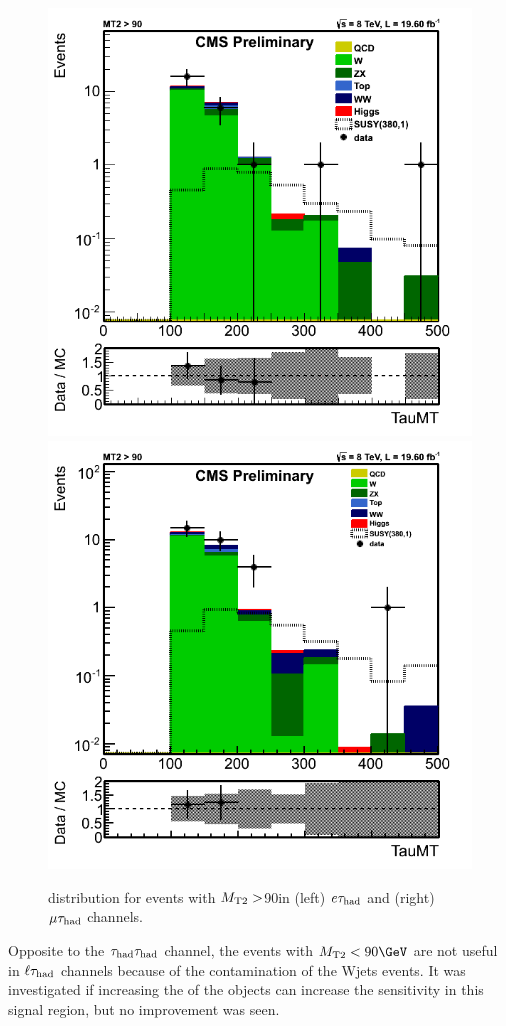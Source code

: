 \begin{figure}[!Hhtb]
\centering
\includegraphics[angle=0,scale=0.35]{SelectionEleTau/TauMT.png}
\includegraphics[angle=0,scale=0.35]{SelectionMuTau/tauMT_Ratio_MT2gt90_unBlinded.png}
\caption{\tauMT distribution for events with ${M_{\rm T2}}>$90\GeV in (left) $e\tau_{\rm had}$ and (right) $\mu\tau_{\rm had}$ channels.}
\label{fig:taumtleptontau}
\end{figure}
Opposite to the $\tau_{\rm had}\tau_{\rm had}$ channel, the events with $\mttwo<90 \GeV$ are not useful in $\ell\tau_{\rm had}$ channels because of the contamination of
the Wjets events. It was investigated if increasing the \PT of the objects can increase the sensitivity in this signal region, but no improvement was seen.

